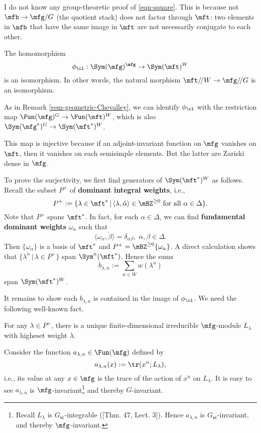 	\begin{warn}
		I do not know any group-theoretic proof of \eqref{eqn-square}. This is because not $\mfb \to \mfg/G$ (the quotient stack) does not factor through $\mft$: two elements in $\mfb$ that have the same image in $\mft$ are not necessarily conjugate to each other.
	\end{warn}

	\begin{thm}[Chevalley]
		The homomorphism 
		\[
			\phi_\cl: \Sym(\mfg)^\mfg  \to  \Sym(\mft)^W
		\]
		is an isomorphism. In other words, the natural morphism $\mft/\!/ W \to \mfg/\!/G$ is an isomorphism.
	\end{thm}

	\proof
		As in Remark \ref{rem-geometric-Chevalley}, we can identify $\phi_\cl$ with the restriction map $\Fun(\mfg)^G \to \Fun(\mft)^W$, which is also $\Sym(\mfg^*)^G \to \Sym(\mft^*)^W$.

		This map is injective because if an adjoint-invariant function on $\mfg$ vanishes on $\mft$, then it vanishes on each semisimple elements. But the latter are Zariski dense in $\mfg$.

		To prove the surjectivity, we first find generators of $\Sym(\mft^*)^W$ as follows. Recall the subset $P^+$ of \textbf{dominant integral weights}, i.e.,
		\[
			P^+ := \{ \lambda\in \mft^*\,\vert\, \langle\lambda,\check\alpha\rangle \in \mBZ^{\ge 0} \textrm{ for all }  \alpha\in \Delta \}.
		\]
		Note that $P^+$ spans $\mft^*$. In fact, for each $\alpha\in \Delta$, we can find \textbf{fundamental dominant weights} $\omega_\alpha$ such that
		\[
			\langle \omega_\alpha,\check \beta \rangle = \delta_{\alpha\beta},\; \alpha,\beta\in \Delta.
		\]
		Then $\{\omega_\alpha\}$ is a basis of $\mft^*$ and $P^+= \mBZ^{\ge 0}\{\omega_\alpha\}$. A direct calculation shows that $\{\lambda^n\,\vert\, \lambda\in P^+ \}$ span $\Sym^n(\mft^*)$. Hence the sums
		\[
			b_{\lambda,n}:= \sum_{w\in W} w( \lambda^n )
		\]
		span $\Sym(\mft^*)^W$.
		
		It remains to show each $b_{\lambda,n}$ is contained in the image of $\phi_\cl$. We need the following well-known fact.

		\begin{thm}[Weyl]
			For any $\lambda\in P^+$, there is a unique finite-dimensional irreducible $\mfg$-module $L_\lambda$ with higheset weight $\lambda$.
		\end{thm}

		Consider the function $a_{\lambda,n}\in \Fun(\mfg) $ defined by
		\[
			a_{\lambda,n}(x):=\tr(x^n; L_\lambda),
		\]
		i.e., its value at any $x\in \mfg$ is the trace of the action of $x^n$ on $L_\lambda$. It is easy to see $a_{\lambda,n}$ is $\mfg$-invariant\footnote{Recall $L_\lambda$ is $G_\mathsf{sc}$-integrable ([Thm. 47, Lect. 3]). Hence $a_{\lambda,n}$ is $G_\mathsf{sc}$-invariant, and thereby $\mfg$-invariant.
		} and thereby $G$-invariant. 

